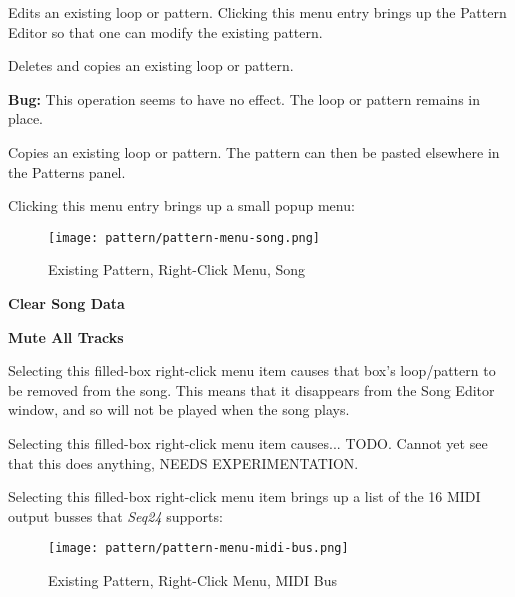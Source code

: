    \setcounter{ItemCounter}{0}      %

   Edits an existing loop or pattern.
   Clicking this menu entry brings up the Pattern Editor
   so that one can modify the existing pattern.

   Deletes and copies an existing loop or pattern.

   \textbf{Bug:}
   This operation seems to have no effect.  The loop or pattern remains in
   place.

   Copies an existing loop or pattern.
   The pattern can then be pasted elsewhere in the Patterns panel.

   Clicking this menu entry brings up a small popup menu:

\begin{figure}[H]
   \centering 
   \texttt{[image: pattern/pattern-menu-song.png]}
   \caption{Existing Pattern, Right-Click Menu, Song}
   \label{fig:pattern_window_right_click_song}
\end{figure}

   \begin{enumber}
      \item \textbf{Clear Song Data}
      \item \textbf{Mute All Tracks}
   \end{enumber}

   \setcounter{ItemCounter}{0}      %

   Selecting this filled-box right-click menu item causes that box's
   loop/pattern to be removed from the song.  This means
   that it disappears from the Song Editor window, and so will not
   be played when the song plays.

   Selecting this filled-box right-click menu item causes...
   TODO.  Cannot yet see that this does anything, NEEDS EXPERIMENTATION.

   Selecting this filled-box right-click menu item brings up a list
   of the 16 MIDI output busses that \textsl{Seq24} supports:

\begin{figure}[H]
   \centering 
   \texttt{[image: pattern/pattern-menu-midi-bus.png]}
   \caption{Existing Pattern, Right-Click Menu, MIDI Bus}
   \label{fig:pattern_window_right_click_midi_bus}
\end{figure}

